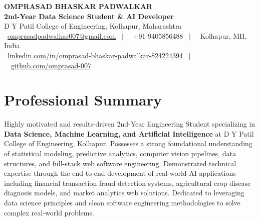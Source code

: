 \documentclass[a4paper,10pt]{article}
\begin{document}
\begin{center}
    {\Huge \bfseries \color{darktext} OMPRASAD BHASKAR PADWALKAR} \\[4pt]
    {\large \bfseries \color{primary} 2nd-Year Data Science Student \& AI Developer} \\[2pt]
    {\small \color{subtext} D Y Patil College of Engineering, Kolhapur, Maharashtra} \\[5pt]
    {\small
        \faEnvelope\ \href{mailto:omprasadpadwalkar007@gmail.com}{omprasadpadwalkar007@gmail.com} \ $|$ \
        \faPhone\ +91 9405856488 \ $|$ \
        \faMapMarkerAlt\ Kolhapur, MH, India \\
        \faLinkedin\ \href{https://www.linkedin.com/in/omprasad-bhaskar-padwalkar-824224394}{linkedin.com/in/omprasad-bhaskar-padwalkar-824224394} \ $|$ \
        \faGithub\ \href{https://github.com/omprasad-007}{github.com/omprasad-007}
    }
\end{center}

\vspace{-4pt}

\section{Professional Summary}
Highly motivated and results-driven 2nd-Year Engineering Student specializing in \textbf{Data Science, Machine Learning, and Artificial Intelligence} at D Y Patil College of Engineering, Kolhapur. Possesses a strong foundational understanding of statistical modeling, predictive analytics, computer vision pipelines, data structures, and full-stack web software engineering. Demonstrated technical expertise through the end-to-end development of real-world AI applications including financial transaction fraud detection systems, agricultural crop disease diagnosis models, and market analytics web solutions. Dedicated to leveraging data science principles and clean software engineering methodologies to solve complex real-world problems.

\end{document}
